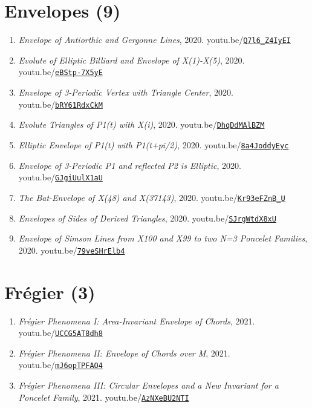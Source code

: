 \documentclass[12pt]{article}
\begin{document}
\section{Envelopes (9)}

\begin{enumerate}[resume]
\item \textit{Envelope of Antiorthic and Gergonne Lines}, 2020. youtu.be/\href{https://youtu.be/Q7l6_Z4IyEI}{\nolinkurl{Q7l6\_Z4IyEI}}
\item \textit{Evolute of Elliptic Billiard and Envelope of X(1)-X(5)}, 2020. youtu.be/\href{https://youtu.be/eBStp-7X5yE}{\nolinkurl{eBStp-7X5yE}}
\item \textit{Envelope of 3-Periodic Vertex with Triangle Center}, 2020. youtu.be/\href{https://youtu.be/bRY61RdxCkM}{\nolinkurl{bRY61RdxCkM}}
\item \textit{Evolute Triangles of P1(t) with X(i)}, 2020. youtu.be/\href{https://youtu.be/DhqDdMAlBZM}{\nolinkurl{DhqDdMAlBZM}}
\item \textit{Elliptic Envelope of P1(t) with P1(t+pi/2)}, 2020. youtu.be/\href{https://youtu.be/8a4JoddyEyc}{\nolinkurl{8a4JoddyEyc}}
\item \textit{Envelope of 3-Periodic P1 and reflected P2 is Elliptic}, 2020. youtu.be/\href{https://youtu.be/GJgiUulX1aU}{\nolinkurl{GJgiUulX1aU}}
\item \textit{The Bat-Envelope of X(48) and X(37143)}, 2020. youtu.be/\href{https://youtu.be/Kr93eFZnB_U}{\nolinkurl{Kr93eFZnB\_U}}
\item \textit{Envelopes of Sides of Derived Triangles}, 2020. youtu.be/\href{https://youtu.be/SJrgWtdX8xU}{\nolinkurl{SJrgWtdX8xU}}
\item \textit{Envelope of Simson Lines from X100 and X99 to two N=3 Poncelet Families}, 2020. youtu.be/\href{https://youtu.be/79veSHrElb4}{\nolinkurl{79veSHrElb4}}
\end{enumerate}

\section{Frégier (3)}

\begin{enumerate}[resume]
\item \textit{Frégier Phenomena I: Area-Invariant Envelope of Chords}, 2021. youtu.be/\href{https://youtu.be/UCCG5AT8dh8}{\nolinkurl{UCCG5AT8dh8}}
\item \textit{Frégier Phenomena II: Envelope of Chords over M}, 2021. youtu.be/\href{https://youtu.be/mJ6opTPFAO4}{\nolinkurl{mJ6opTPFAO4}}
\item \textit{Frégier Phenomena III: Circular Envelopes and a New Invariant for a Poncelet Family}, 2021. youtu.be/\href{https://youtu.be/AzNXeBU2NTI}{\nolinkurl{AzNXeBU2NTI}}
\end{enumerate}
\end{document}

